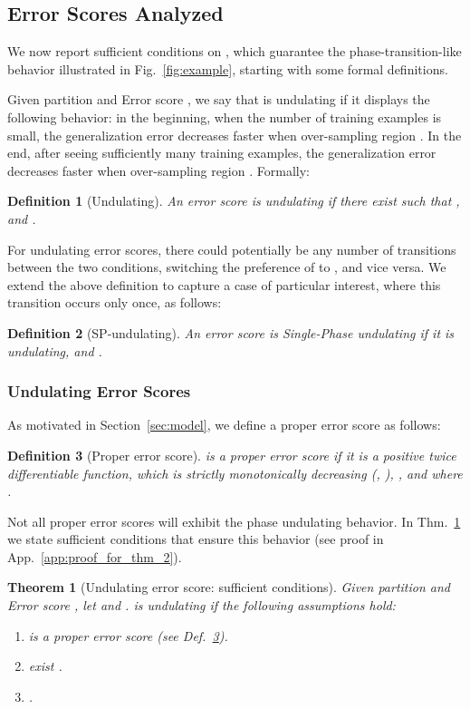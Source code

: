 \documentclass{article}
\newcommand{\app}{App.}
\newtheorem{theorem}{Theorem}
\newtheorem{defn}{Definition}
\begin{document}
\subsection{Error Scores Analyzed}
\label{sec:error-fs}

We now report sufficient conditions on , which guarantee the phase-transition-like behavior illustrated in Fig.~\ref{fig:example}, starting with some formal definitions.

Given partition  and Error score , we say that  is undulating if it displays the following behavior: in the beginning, when the number of training examples is small, the generalization error decreases faster when over-sampling region . In the end, after seeing sufficiently many training examples, the generalization error decreases faster when  over-sampling region . Formally: 
\begin{defn}[Undulating] An error score  is undulating if there exist  such that  , and .
\label{def:1}
\end{defn}
For undulating error scores, there could potentially be any number of transitions between the two conditions, switching the preference of  to , and vice versa. We extend the above definition to capture a case of particular interest, where this transition occurs only once, as follows: 
\begin{defn}[SP-undulating] An error score  is Single-Phase undulating if it is undulating, and .
\label{def:2}
\end{defn} 

\subsubsection{Undulating Error Scores}
As motivated in Section~\ref{sec:model}, we define a proper error score as follows:
\begin{defn}[Proper error score]  is a proper error score if it is a positive twice differentiable function, which is strictly monotonically decreasing (, ), , and where .
\label{def:proper}
\end{defn} 

Not all proper error scores will exhibit the phase undulating behavior. In Thm.~\ref{thm:suffiecnt_coniditions_undulating} we state sufficient conditions that ensure this behavior (see proof in \app~\ref{app:proof_for_thm_2}).
\begin{theorem}[Undulating error score: sufficient conditions]
\label{thm:suffiecnt_coniditions_undulating}
Given partition  and Error score , let  and .  is undulating if the following assumptions hold:
\begin{enumerate}[label=(\roman*)]
\item  is a proper \emph{error score} (see Def.~\ref{def:proper}).
\label{T2a1}
\item \label{T2a2}
 exist .
\item 
\label{T2a3}
. 
\end{enumerate}
\end{theorem}
\end{document}
